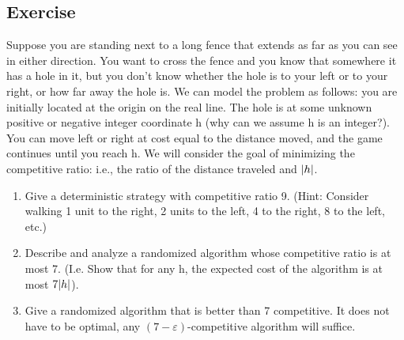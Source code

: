 \documentclass{article}
\newcounter{counter}
\newcommand{\Exercise}{Exercise \stepcounter{counter}\thecounter}
\DeclarePairedDelimiter\abs{\lvert}{\rvert}%
\begin{document}
\subsection*{\Exercise}
    Suppose you are standing next to a long fence that extends as far as you can see in either direction. You want to cross the fence and you know that somewhere it has a hole in it, but you don't know whether the hole is to your left or to your right, or how far away the hole is. We can model the problem as follows: you are initially located at the origin on the real line. The hole is at some unknown positive or negative integer coordinate h (why can we assume h is an integer?). You can move left or right at cost equal to the distance moved, and the game continues until you reach h. We will consider the goal of minimizing the competitive ratio: i.e., the ratio of the distance traveled and $\abs{h}$.

  \begin{enumerate}
    \item Give a deterministic strategy with competitive ratio 9. (Hint: Consider walking 1 unit to the right, 2 units to the left, 4 to the right, 8 to the left, etc.)
    \item Describe and analyze a randomized algorithm whose competitive ratio is at most 7. (I.e. Show that for any h, the expected cost of the algorithm is at most $7\abs{h}$).
    \item   Give a randomized algorithm that is better than 7 competitive. It does not have to be optimal, any $(7-\varepsilon)$-competitive algorithm will suffice.
  \end{enumerate}
\end{document}
